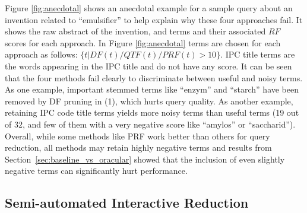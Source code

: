 
\vspace*{0.5mm}
Figure \ref{fig:anecdotal} shows an anecdotal example for a sample query about an invention related to ``emulsifier'' to help explain why these four approaches fail. It shows the raw abstract of the invention, and terms and their associated $\mathit{RF}$ scores for each approach. In Figure \ref{fig:anecdotal} terms are chosen for each approach  as follows: $\{t| DF(t)/QTF(t)/PRF(t)>10\}$. IPC title terms are the words appearing in the IPC title and do not have any score.
It can be seen that the four methods fail clearly to discriminate between useful and noisy terms. As one example, important stemmed terms like ``enzym'' and ``starch'' have been removed by DF pruning in (1), which hurts query quality.  As another example, retaining IPC code title terms yields more noisy terms than useful terms (19 out of 32, and few of them with a very negative score like ``amylos'' or ``saccharid'').  Overall, while some methods like PRF work better than others for query reduction, all methods may retain highly negative terms and results from Section~\ref{sec:baseline_vs_oracular} showed that the inclusion of even slightly negative terms can significantly hurt performance.
 


\subsection{Semi-automated Interactive Reduction}

\label{sec:SemiAutomatedInteractiveReduction}

